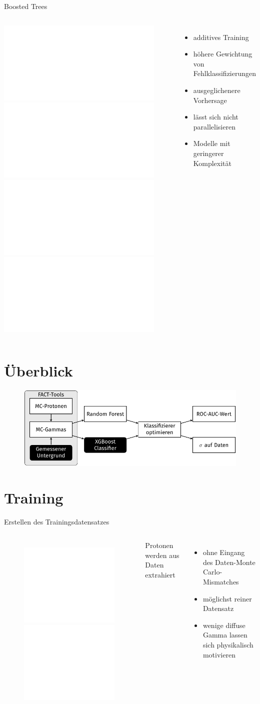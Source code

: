 \documentclass[aspectratio=1610, professionalfonts, 9pt]{beamer}
\begin{document}
\begin{frame}{Boosted Trees}
  \begin{columns}[onlytextwidth]
	\includegraphics<1>[width=\textwidth]{./tikz/BoostedTree/BoostedTree1.pdf}
	\includegraphics<2>[width=\textwidth]{./tikz/BoostedTree/BoostedTree2.pdf}
	\includegraphics<3>[width=\textwidth]{./tikz/BoostedTree/BoostedTree3.pdf}
	\includegraphics<4>[width=\textwidth]{./tikz/BoostedTree/BoostedTree.pdf}
	\begin{itemize}
	  \item additives Training
	  \item höhere Gewichtung von Fehlklassifizierungen
	  \item ausgeglichenere Vorhersage
	  \item lässt sich nicht parallelisieren
	  \item Modelle mit geringerer Komplexität
	\end{itemize}
  \end{columns}
\end{frame}

\section{Überblick}
\begin{frame}
  \begin{figure}
	\centering
	\includegraphics[width=\textwidth]{./tikz/Motiv/Motiv.pdf}
  \end{figure}
\end{frame}

\section{Training}
\begin{frame}{Erstellen des Trainingsdatensatzes}
  \begin{columns}[onlytextwidth]
	\begin{figure}
	  \centering
	  \includegraphics<1>[height=0.9\textheight]{./tikz/ThetaCut/ThetaCut.pdf}
	  \includegraphics<2>[height=0.9\textheight]{./Plots/theta_cut.pdf}
	\end{figure}
	Protonen werden aus Daten extrahiert
	\begin{itemize}
	  \item ohne Eingang des Daten-Monte Carlo-Mismatches
	  \item möglichst reiner Datensatz
	  \item wenige diffuse Gamma lassen sich physikalisch motivieren
	\end{itemize}
  \end{columns}
\end{frame}
\end{document}
